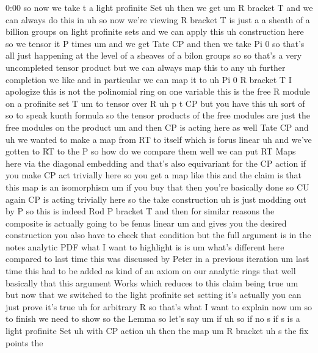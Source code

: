\begin{unfinished}{0:00}
so  now  we  take  t  a  light  profinite
Set  uh  then  we  get
um  R  bracket  T  and  we  can  always  do  this
in
uh  so  now  we're  viewing  R  bracket  T  is
just  a  a  sheath  of  a  billion  groups  on
light  profinite  sets  and  we  can  apply
this  uh  construction  here  so  we  tensor
it  P
times
um  and  we  get  Tate
CP  and  then  we  take  Pi  0  so  that's  all
just  happening  at  the  level  of  a  sheaves
of  a  bilon  groups  so  so  that's  a  very
uncompleted  tensor  product  but  we  can
always  map  this  to  any  uh  further
completion  we  like  and  in  particular  we
can  map  it  to  uh  Pi  0  R  bracket  T  I
apologize  this  is  not  the  polinomial
ring  on  one  variable  this  is  the  free  R
module  on  a  profinite  set
T  um  to  tensor  over  R  uh  p  t
CP  but  you  have  this  uh  sort  of  so  to
speak  kunth  formula  so  the  tensor
products  of  the  free  modules  are  just
the  free  modules  on  the  product
um  and  then  CP  is  acting  here  as  well
Tate
CP
and  uh  we  wanted  to  make  a  map  from  RT
to  itself  which  is  forus  linear  uh  and
we've  gotten  to  RT  to  the  P  so  how  do  we
compare  them  well  we  can  put  RT  Maps
here  via  the  diagonal
embedding  and  that's  also  equivariant
for  the  CP  action  if  you  make  CP  act
trivially  here  so  you  get  a  map  like
this  and  the
claim  is  that  this  map  is  an
isomorphism  um  if  you  buy  that  then
you're  basically  done  so  CU  again  CP  is
acting  trivially  here  so  the  take
construction  uh  is  just  modding  out  by  P
so  this  is  indeed  Rod  P  bracket  T  and
then  for  similar  reasons  the  composite
is  actually  going  to  be  fenus  linear  um
and  gives  you  the  desired  construction
you  also  have  to  check  that  condition
but  the  full  argument  is  in  the  notes
analytic
PDF  what  I  want  to  highlight  is  is  um
what's  different  here  compared  to  last
time  this  was  discussed  by  Peter  in  a
previous
iteration
um  last  time  this  had  to  be  added  as
kind  of  an  axiom  on  our  analytic  rings
that  well  basically  that  this  argument
Works  which  reduces  to  this  claim  being
true  um  but  now  that  we  switched  to  the
light  profinite  set  setting  it's
actually  you  can  just  prove  it's  true  uh
for  arbitrary  R  so  that's  what  I  want  to
explain  now  um  so
to
finish  we  need  to
show  so  the
Lemma  so  let's  say
um  if  uh  so  if  no  s  if  s  is  a  light
profinite
Set  uh  with  CP
action  uh  then  the
map  um  R  bracket  uh  s  the  fix  points  the

\end{unfinished}
